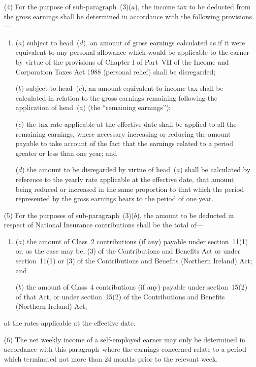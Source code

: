 \documentclass[12pt,a4paper]{article}
\begin{document}
(4) For the purpose of sub-paragraph~(3)($a$), the income tax to be deducted from the gross earnings shall be determined in accordance with the following provisions—
\begin{enumerate}\item[]
($a$) subject to head~($d$), an amount of gross earnings 
calculated as if it were equivalent to any personal allowance which would be  %
applicable to the earner by virtue of the provisions of Chapter I of Part~VII of the Income and Corporation Taxes Act 1988 (personal relief) shall be disregarded;

($b$) subject to head~($c$), an amount equivalent to income tax shall be calculated in relation to the gross earnings remaining following the application of head~($a$)  (the “remaining earnings”);

($c$) the tax rate applicable at the effective date shall be applied to all the remaining earnings, where necessary increasing or reducing the amount payable to take account of the fact that the earnings related to a period greater or less than one year; and

($d$) the amount to be disregarded by virtue of head~($a$)  shall be calculated by reference to the yearly rate applicable at the effective date, that amount being reduced or increased in the same proportion to that which the period represented by the gross earnings bears to the period of one year.
\end{enumerate}

(5) For the purposes of sub-paragraph~(3)($b$), the amount to be deducted in respect of National Insurance contributions shall be the total of—
\begin{enumerate}\item[]
($a$) the amount of Class~2 contributions (if any) payable under section~11(1) or, as the case may be, (3) of the Contributions and Benefits Act or under section~11(1) or (3) of the Contributions and Benefits (Northern Ireland) Act; and

($b$) the amount of Class~4 contributions (if any) payable under section~15(2) of that Act, or under section~15(2) of the Contributions and Benefits (Northern Ireland) Act,
\end{enumerate}
at the rates applicable at the effective date.

(6) The net weekly income of a self-employed earner may only be determined in accordance with this paragraph~where the earnings concerned relate to a period which terminated not more than 24 months prior to the relevant week.
\end{document}
